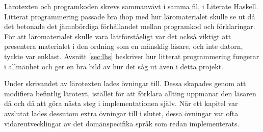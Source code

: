 Lärotexten och programkoden skrevs sammanvävt i samma fil, i Literate
Haskell. Litterat programmering passade bra ihop med
hur läromaterialet skulle se ut då det betonade det jämnbördiga förhållandet
mellan programkod och förklaringar. För att läromaterialet skulle vara
lättförståeligt var det också viktigt att presentera materialet i den ordning
som en mänsklig läsare, och inte datorn, tyckte var enklast. Avsnitt \ref{sec:lhs} beskriver hur litterat programmering fungerar i allmänhet och ger
en bra bild av hur det såg ut även i detta projekt.

Under skrivandet av lärotexten lades övningar till. Dessa skapades genom att
modifiera befintlig lärotext, istället för att förklara allting uppmanar den
läsaren då och då att göra nästa steg i implementationen själv. När ett kapitel
var avslutat lades dessutom extra övningar till i slutet, dessa övningar var
ofta vidareutvecklingar av det domänspecifika språk som redan implementerats.


%

